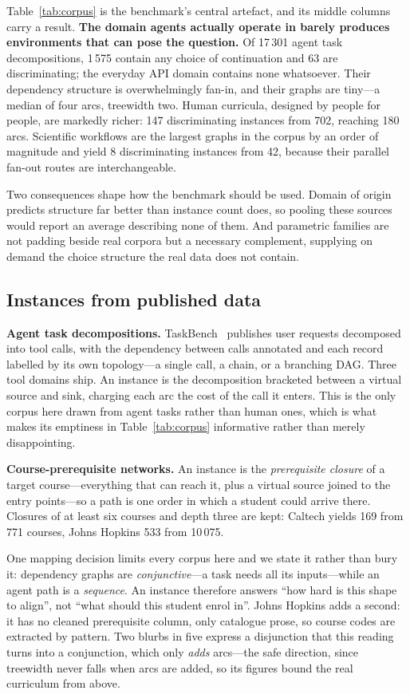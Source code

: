 \documentclass{article}
\begin{document}
Table~\ref{tab:corpus} is the benchmark's central artefact, and its middle columns
carry a result. \textbf{The domain agents actually operate in barely produces
environments that can pose the question.} Of 17\,301 agent task decompositions,
1\,575 contain any choice of continuation and 63 are discriminating; the everyday
API domain contains none whatsoever. Their dependency structure is overwhelmingly
fan-in, and their graphs are tiny---a median of four arcs, treewidth two. Human
curricula, designed by people for people, are markedly richer: 147 discriminating
instances from 702, reaching 180 arcs. Scientific workflows are the largest graphs
in the corpus by an order of magnitude and yield 8 discriminating instances from 42,
because their parallel fan-out routes are interchangeable.

Two consequences shape how the benchmark should be used. Domain of origin predicts
structure far better than instance count does, so pooling these sources would report
an average describing none of them. And parametric families are not padding beside
real corpora but a necessary complement, supplying on demand the choice structure
the real data does not contain.

\subsection{Instances from published data}

\textbf{Agent task decompositions.} TaskBench~\cite{taskbench} publishes user
requests decomposed into tool calls, with the dependency between calls annotated and
each record labelled by its own topology---a single call, a chain, or a branching
DAG. Three tool domains ship. An instance is the decomposition bracketed between a
virtual source and sink, charging each arc the cost of the call it enters. This is
the only corpus here drawn from agent tasks rather than human ones, which is what
makes its emptiness in Table~\ref{tab:corpus} informative rather than merely
disappointing.

\textbf{Course-prerequisite networks.} An instance is the \emph{prerequisite
closure} of a target course---everything that can reach it, plus a virtual source
joined to the entry points---so a path is one order in which a student could arrive
there. Closures of at least six courses and depth three are kept: Caltech yields 169
from 771 courses, Johns Hopkins 533 from 10\,075.

One mapping decision limits every corpus here and we state it rather than bury it:
dependency graphs are \emph{conjunctive}---a task needs all its inputs---while an
agent path is a \emph{sequence}. An instance therefore answers ``how hard is this
shape to align'', not ``what should this student enrol in''. Johns Hopkins adds a
second: it has no cleaned prerequisite column, only catalogue prose, so course codes
are extracted by pattern. Two blurbs in five express a disjunction that this reading
turns into a conjunction, which only \emph{adds} arcs---the safe direction, since
treewidth never falls when arcs are added, so its figures bound the real curriculum
from above.
\end{document}
